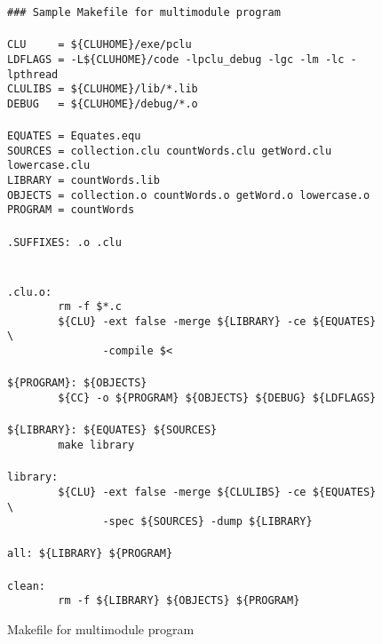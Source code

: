 \begin{figure}
\small
\begin{boxdisplay}
\verb`### Sample Makefile for multimodule program`\\
\verb``\\
\verb`CLU     = ${CLUHOME}/exe/pclu                                   `\\
\verb`LDFLAGS = -L${CLUHOME}/code -lpclu_debug -lgc -lm -lc -lpthread `\\
\verb`CLULIBS = ${CLUHOME}/lib/*.lib                                  `\\
\verb`DEBUG   = ${CLUHOME}/debug/*.o                                  `\\
\verb``\\
\verb`EQUATES = Equates.equ`\\
\verb`SOURCES = collection.clu countWords.clu getWord.clu lowercase.clu`\\
\verb`LIBRARY = countWords.lib`\\
\verb`OBJECTS = collection.o countWords.o getWord.o lowercase.o`\\
\verb`PROGRAM = countWords`\\
\verb``\\
\verb`.SUFFIXES: .o .clu`\\
\verb``\\
\verb``\\
\verb`.clu.o:`\\
\verb`        rm -f $*.c`\\
\verb`        ${CLU} -ext false -merge ${LIBRARY} -ce ${EQUATES} \`\\
\verb`               -compile $<`\\
\verb``\\
\verb`${PROGRAM}: ${OBJECTS}`\\
\verb`        ${CC} -o ${PROGRAM} ${OBJECTS} ${DEBUG} ${LDFLAGS}`\\
\verb``\\
\verb`${LIBRARY}: ${EQUATES} ${SOURCES}`\\
\verb`        make library`\\
\verb``\\
\verb`library:`\\
\verb`        ${CLU} -ext false -merge ${CLULIBS} -ce ${EQUATES} \`\\
\verb`               -spec ${SOURCES} -dump ${LIBRARY}`\\
\verb``\\
\verb`all: ${LIBRARY} ${PROGRAM}`\\
\verb``\\
\verb`clean:`\\
\verb`        rm -f ${LIBRARY} ${OBJECTS} ${PROGRAM}`\\
\end{boxdisplay}
\caption{Makefile for multimodule program}
\label{makeC}
\end{figure}

